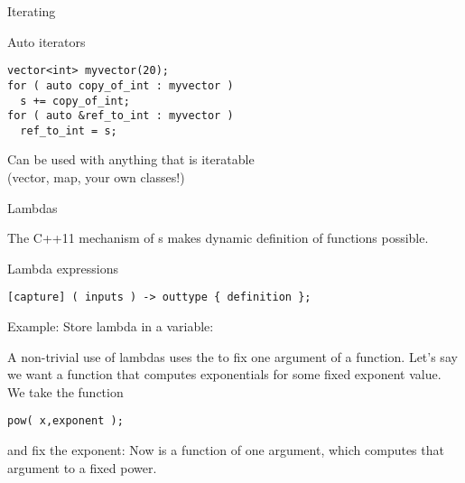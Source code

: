 \begin{comment}
  \begin{block}{Auto plus}
    \label{sl:auto-plus-const}
    Keywords like \n{const} and the reference character~\n{\&} can be
    added:
\begin{verbatim}
// class member
  some_object my_object;
// class method:
  some_object &get_some_object() { return my_object; };
// main program:
auto object_copy  = thing.get_some_object();
auto &object_mutable  = thing.get_some_object();
const auto &object_immutable  = thing.get_some_object();
\end{verbatim}
  \end{block}
\end{comment}

 {Iterating}

\begin{block}{Auto iterators}
  \label{sl:auto-iterator}
\begin{verbatim}
vector<int> myvector(20);
for ( auto copy_of_int : myvector )
  s += copy_of_int;
for ( auto &ref_to_int : myvector )
  ref_to_int = s;
\end{verbatim}
Can be used with anything that is iteratable\\
(vector, map, your own classes!)
\end{block}

 {Lambdas}
\label{sec:lambda}

The C++11 mechanism of s makes
dynamic definition of functions possible.

\begin{block}{Lambda expressions}
  \label{sl:lambda-syntax}
\begin{verbatim}
[capture] ( inputs ) -> outtype { definition };
\end{verbatim}
Example:
Store lambda in a variable:
\end{block}

A non-trivial use of lambdas uses the  to fix one argument of a
function.
Let's say we want a function that computes exponentials for some fixed
exponent value. We take the 
 function
\begin{verbatim}
pow( x,exponent );
\end{verbatim}
and fix the exponent:
%
%
Now  is a function of one argument, which computes
that argument to a fixed power.

